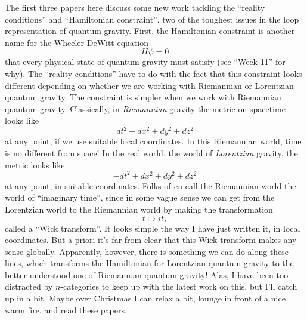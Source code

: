 \documentclass{article}
\renewcommand{\texttt}[1]{%
  \begingroup
  \ttfamily
  \begingroup\lccode`~=`/\lowercase{\endgroup\def~}{/\discretionary{}{}{}}%
  \begingroup\lccode`~=`[\lowercase{\endgroup\def~}{[\discretionary{}{}{}}%
  \begingroup\lccode`~=`.\lowercase{\endgroup\def~}{.\discretionary{}{}{}}%
  \catcode`/=\active\catcode`[=\active\catcode`.=\active
  \scantokens{#1\noexpand}%
  \endgroup
}
\begin{document}

The first three papers here discuss some new work tackling the ``reality
conditions'' and ``Hamiltonian constraint'', two of the toughest issues
in the loop representation of quantum gravity. First, the Hamiltonian
constraint is another name for the Wheeler-DeWitt equation
\[H \psi = 0\] that every physical state of quantum gravity must satisfy
(see \protect\hyperlink{week11}{``Week 11''} for why). The ``reality
conditions'' have to do with the fact that this constraint looks
different depending on whether we are working with Riemannian or
Lorentzian quantum gravity. The constraint is simpler when we work with
Riemannian quantum gravity. Classically, in \emph{Riemannian} gravity
the metric on spacetime looks like \[dt^2 + dx^2 + dy^2 + dz^2\] at any
point, if we use suitable local coordinates. In this Riemannian world,
time is no different from space! In the real world, the world of
\emph{Lorentzian} gravity, the metric looks like
\[-dt^2 + dx^2 + dy^2 + dz^2\] at any point, in suitable coordinates.
Folks often call the Riemannian world the world of ``imaginary time'',
since in some vague sense we can get from the Lorentzian world to the
Riemannian world by making the transformation \[t \mapsto it,\] called a
``Wick transform''. It looks simple the way I have just written it, in
local coordinates. But a priori it's far from clear that this Wick
transform makes any sense globally. Apparently, however, there is
something we can do along these lines, which transforms the Hamiltonian
for Lorentzian quantum gravity to the better-understood one of
Riemannian quantum gravity! Alas, I have been too distracted by
\(n\)-categories to keep up with the latest work on this, but I'll catch
up in a bit. Maybe over Christmas I can relax a bit, lounge in front of
a nice warm fire, and read these papers.
\end{document}
